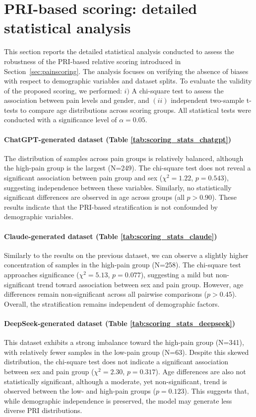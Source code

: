 \documentclass[preprint,12pt,authoryear]{elsarticle}
\begin{document}
\section{PRI-based scoring: detailed statistical analysis}
\label{app:pri_scoring_stats}
This section reports the detailed statistical analysis conducted to assess the robustness of the PRI-based relative scoring introduced in Section~\ref{sec:painscoring}. The analysis focuses on verifying the absence of biases with respect to demographic variables and dataset splits. To evaluate the validity of the proposed scoring, we performed: $i)$ A chi-square test to assess the association between pain levels and gender, and $(ii)$ independent two-sample t-tests to compare age distributions across scoring groups. All statistical tests were conducted with a significance level of $\alpha = 0.05$.

\paragraph{ChatGPT-generated dataset (Table \ref{tab:scoring_stats_chatgpt})}
The distribution of samples across pain groups is relatively balanced, although the high-pain group is the largest (N=249). The chi-square test does not reveal a significant association between pain group and sex ($\chi^2 = 1.22$, $p = 0.543$), suggesting independence between these variables. Similarly, no statistically significant differences are observed in age across groups (all $p > 0.90$). These results indicate that the PRI-based stratification is not confounded by demographic variables.

\paragraph{Claude-generated dataset (Table \ref{tab:scoring_stats_claude})}
Similarly to the results on the previous dataset, we can observe a slightly higher concentration of samples in the high-pain group (N=258). The chi-square test approaches significance ($\chi^2 = 5.13$, $p = 0.077$), suggesting a mild but non-significant trend toward association between sex and pain group. However, age differences remain non-significant across all pairwise comparisons ($p > 0.45$). Overall, the stratification remains independent of demographic factors.

\paragraph{DeepSeek-generated dataset (Table \ref{tab:scoring_stats_deepseek})}
This dataset exhibits a strong imbalance toward the high-pain group (N=341), with relatively fewer samples in the low-pain group (N=63). Despite this skewed distribution, the chi-square test does not indicate a significant association between sex and pain group ($\chi^2 = 2.30$, $p = 0.317$). Age differences are also not statistically significant, although a moderate, yet non-significant, trend is observed between the low- and high-pain groups ($p = 0.123$). This suggests that, while demographic independence is preserved, the model may generate less diverse PRI distributions.
\end{document}
